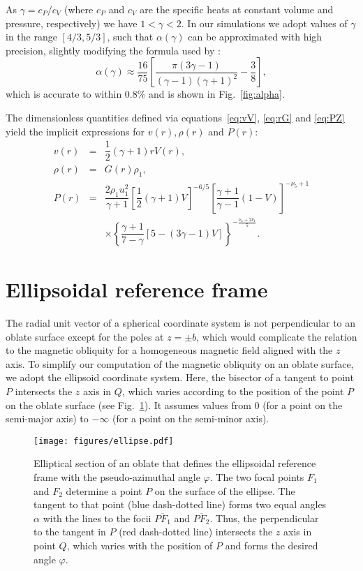 \documentclass[8pt,a4paper,usenatbib]{mnras}
\begin{document}
As $\gamma = c_P/c_V$ (where $c_P$ and $c_V$ are the specific heats at
constant volume and pressure, respectively) we have $1 < \gamma < 2$.  In our
simulations we adopt values of $\gamma$ in the range $[4/3, 5/3]$, such that
$\alpha(\gamma)$ can be approximated with high precision, slightly modifying the
formula used by \citet{1984oup..book.....M}:
\begin{equation}
  \alpha(\gamma) \approx \dfrac{16}{75}
  \left[ \dfrac{\pi (3\gamma-1)}{(\gamma-1)(\gamma+1)^2} -\dfrac{3}{8}\right]  ,
\end{equation} 
which is accurate to within 0.8\% and is shown in Fig.~\ref{fig:alpha}.


The dimensionless quantities defined via equations~\eqref{eq:vV}, \eqref{eq:rG}
and \eqref{eq:PZ} yield the implicit expressions for $v(r), \rho(r)$ and $P(r)$:
\begin{eqnarray}
v(r) &=& \dfrac{1}{2} (\gamma +1 ) r V(r) ,\\
\rho(r) &=& G(r) \rho_1 ,\\
P(r) &= & \dfrac{2\rho_1 u^2_1 }{\gamma+1} \left[ \dfrac{1}{2} (\gamma + 1) V\right]^{-6/5} \left[ \dfrac{\gamma + 1}{\gamma - 1} \left( 1 -  V \right) \right]^{-\nu_5 + 1} \nonumber\\
&& \times \left\lbrace \dfrac{\gamma+1}{7-\gamma}[5-(3\gamma-1)V] \right\rbrace^{-\frac{\nu_4+2\nu_1}{5}}.
\end{eqnarray}


\section{Ellipsoidal reference frame} 
\label{sec:ellipsoid}

The radial unit vector of a spherical coordinate system is not perpendicular to
an oblate surface except for the poles at $z =\pm b$, which would complicate the
relation to the magnetic obliquity for a homogeneous magnetic field aligned with
the $z$ axis. To simplify our computation of the magnetic obliquity on an oblate
surface, we adopt the ellipsoid coordinate system. Here, the bisector of a
tangent to point $P$ intersects the $z$ axis in $Q$, which varies according to
the position of the point $P$ on the oblate surface (see
Fig.~\ref{figD1:ellipse}). It assumes values from $0$ (for a point on the
semi-major axis) to $-\infty$ (for a point on the semi-minor axis).

\begin{figure}
\centering
\texttt{[image: figures/ellipse.pdf]}
\caption{Elliptical section of an oblate that defines the ellipsoidal reference
  frame with the pseudo-azimuthal angle $\varphi$. The two focal points $F_1$
  and $F_2$ determine a point $P$ on the surface of the ellipse. The tangent to
  that point (blue dash-dotted line) forms two equal angles $\alpha$ with the
  lines to the focii $\overline{P F_1}$ and $\overline{P F_2}$. Thus, the
  perpendicular to the tangent in $P$ (red dash-dotted line) intersects the $z$
  axis in point $Q$, which varies with the position of $P$ and forms the desired
  angle $\varphi$. }
\label{figD1:ellipse}
\end{figure} 
\end{document}
